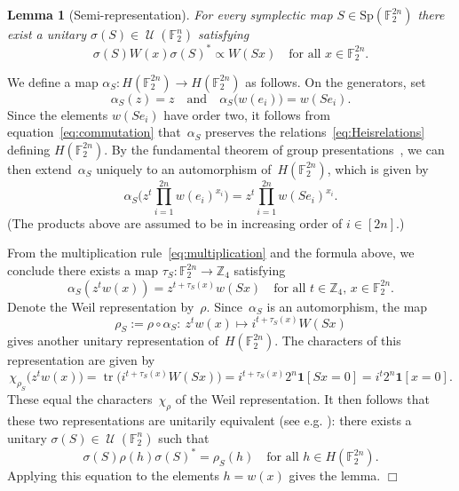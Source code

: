 \documentclass[11pt]{amsart}
\newcommand{\Z}{\mathbb{Z}} %
\newcommand{\F}{\mathbb{F}} %
\newcommand{\Sp}{\mathrm{Sp}}
\newcommand{\one}{\mathbf{1}}
\DeclareMathOperator{\U}{\mathcal{U}}
\DeclareMathOperator{\tr}{tr}
\theoremstyle{plain}
\newtheorem{lemma}[theorem]{Lemma}
\theoremstyle{definition}
\theoremstyle{remark}
\renewenvironment{proof}[1][]{
    	\begin{trivlist}
     	\item[\hspace{\labelsep}{\em\noindent Proof#1:\/}]}
     	{{\hfill$\Box$}
    	\end{trivlist}
  }
\begin{document}
\begin{lemma}[Semi-representation] \label{lem:semi_rep}
    For every symplectic map $S\in \Sp(\F_2^{2n})$ there exist a unitary $\sigma(S) \in \U(\F_2^n)$ satisfying
    $$\sigma(S) W(x) \sigma(S)^* \propto W(Sx) \quad \text{for all $x\in \F_2^{2n}$.}$$
\end{lemma}

\begin{proof}
We define a map $\alpha_S: H(\F_2^{2n})\to H(\F_2^{2n})$ as follows.
On the generators, set
\begin{equation*}
    \alpha_S(z) = z
    \quad\text{and}\quad
    \alpha_S\big(w(e_i)\big) = w(Se_i).
\end{equation*}
Since the elements $w(Se_i)$ have order two, it follows from equation~\eqref{eq:commutation} that~$\alpha_S$ preserves the relations~\eqref{eq:Heisrelations} defining $H(\F_2^{2n})$.
By the fundamental theorem of group presentations~\cite[Section~7.10]{artin_algebra}, we can then extend~$\alpha_S$ uniquely to an automorphism of~$H(\F_2^{2n})$, which is given by
$$\alpha_S \bigg(z^t \prod_{i=1}^{2n} w(e_i)^{x_i} \bigg) = z^t \prod_{i=1}^{2n} w(Se_i)^{x_i}.$$
(The products above are assumed to be in increasing order of $i\in [2n]$.)

From the multiplication rule~\eqref{eq:multiplication} and the formula above, we conclude there exists a map $\tau_S: \F_2^{2n} \to \Z_4$ satisfying
$$\alpha_S(z^t w(x)) = z^{t+\tau_S(x)} w(Sx) \quad \text{for all $t\in \Z_4$, $x\in \F_2^{2n}$.}$$
Denote the Weil representation by~$\rho$.
Since~$\alpha_S$ is an automorphism, the map
$$\rho_S := \rho\circ \alpha_S:\: z^t w(x) \mapsto i^{t+\tau_S(x)} W(Sx)$$
gives another unitary representation of~$H(\F_2^{2n})$.
The characters of this representation are given by
\begin{equation*}
    \chi_{\rho_S} \big(z^t w(x)\big) = \tr\big( i^{t+\tau_S(x)} W(Sx)\big) = i^{t+\tau_S(x)} 2^n \one[Sx = 0] = i^{t} 2^n \one[x = 0].
\end{equation*}
These equal the characters~$\chi_\rho$ of the Weil representation.
It then follows that these two representations are unitarily equivalent (see e.g. \cite[Chapter~10]{CSTbook2018}):
there exists a unitary $\sigma(S)\in \U(\F_2^n)$ such that
\begin{equation*}
    \sigma(S) \rho(h) \sigma(S)^* = \rho_S(h) \quad \text{for all $h\in H(\F_2^{2n})$.}
\end{equation*}
Applying this equation to the elements $h = w(x)$ gives the lemma.
\end{proof}
\end{document}
